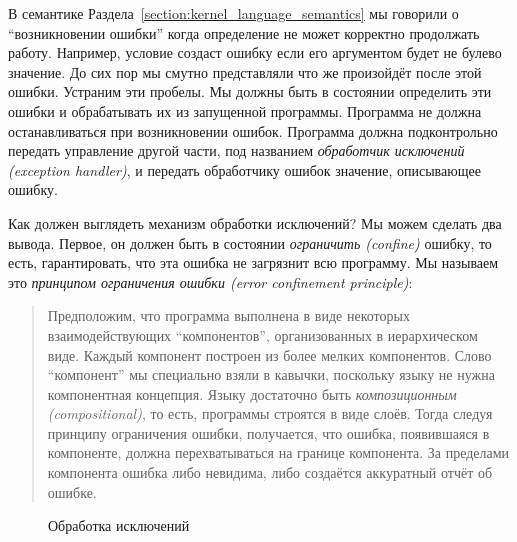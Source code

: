 В семантике Раздела~\ref{section:kernel_language_semantics} мы говорили о ``возникновении ошибки'' когда определение не может корректно продолжать работу. Например, условие создаст ошибку если его аргументом будет не булево значение. До сих пор мы смутно представляли что же произойдёт после этой ошибки. Устраним эти пробелы. Мы должны быть в состоянии определить эти ошибки и обрабатывать их из запущенной программы. Программа не должна останавливаться при возникновении ошибок. Программа должна подконтрольно передать управление другой части, под названием \emph{обработчик исключений (exception handler)}, и передать обработчику ошибок значение, описывающее ошибку.

Как должен выглядеть механизм обработки исключений? Мы можем сделать два вывода. Первое, он должен быть в состоянии \emph{ограничить ({confine})} ошибку, то есть, гарантировать, что эта ошибка не загрязнит всю программу. Мы называем это \emph{принципом ограничения ошибки ({error confinement principle})}:

\begin{quote}
Предположим, что программа выполнена в виде некоторых взаимодействующих ``компонентов'', организованных в иерархическом виде. Каждый компонент построен из более мелких компонентов. Слово ``компонент'' мы специально взяли в кавычки, поскольку языку не нужна компонентная концепция. Языку достаточно быть \emph{композиционным (compositional)}, то есть, программы строятся в виде слоёв. Тогда следуя принципу ограничения ошибки, получается, что ошибка, появившаяся в компоненте, должна перехватываться на границе компонента. За пределами компонента ошибка либо невидима, либо создаётся аккуратный отчёт об ошибке.
\end{quote}

\begin{figure}
\caption{Обработка исключений}
\label{figure:exception_handling}
\end{figure}

